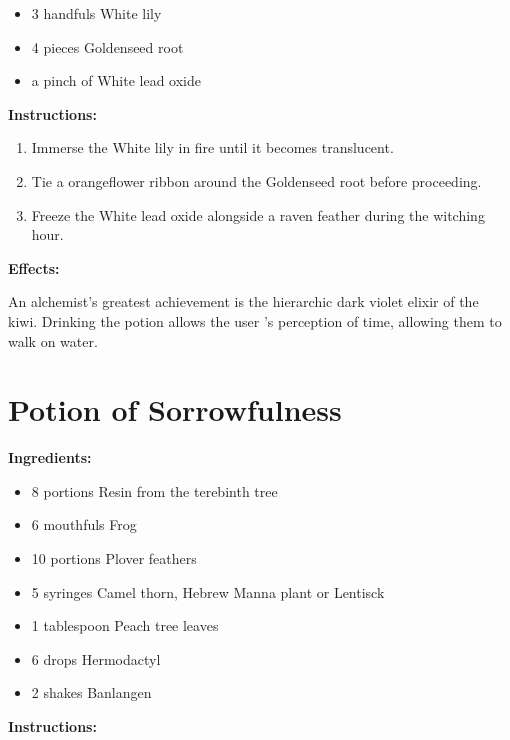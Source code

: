 \documentclass{article}
\begin{document}
\begin{itemize}
  \item 3 handfuls White lily
  \item 4 pieces Goldenseed root
  \item a pinch of White lead oxide
\end{itemize}

\textbf{Instructions:}

\begin{enumerate}
  \item Immerse the White lily in fire until it becomes translucent.
  \item Tie a orangeflower ribbon around the Goldenseed root before proceeding.
  \item Freeze the White lead oxide alongside a raven feather during the witching hour.
\end{enumerate}

\textbf{Effects:}

An alchemist's greatest achievement is the hierarchic dark violet elixir of the kiwi. Drinking the potion allows the user 's perception of time, allowing them to walk on water.

\newpage
\section*{Potion of Sorrowfulness}

\textbf{Ingredients:}

\begin{itemize}
  \item 8 portions Resin from the terebinth tree
  \item 6 mouthfuls Frog
  \item 10 portions Plover feathers
  \item 5 syringes Camel thorn, Hebrew Manna plant  or Lentisck
  \item 1 tablespoon Peach tree leaves
  \item 6 drops Hermodactyl
  \item 2 shakes Banlangen
\end{itemize}

\textbf{Instructions:}
\end{document}
